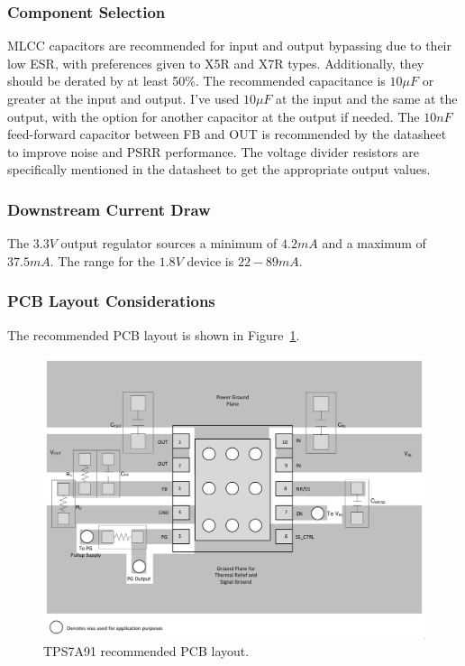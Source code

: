 \subsubsection{Component Selection}
\label{sec:tps7a91-component-selection}

MLCC capacitors are recommended for input and output bypassing due to their low ESR, with
preferences given to X5R and X7R types. Additionally, they should be derated by at least 50\%. The
recommended capacitance is $10 \si{\mu F}$ or greater at the input and output. I've used
$10 \si{\mu F}$ at the input and the same at the output, with the option for another capacitor at
the output if needed. The $10 \si{nF}$ feed-forward capacitor between FB and OUT is recommended by
the datasheet to improve noise and PSRR performance. The voltage divider resistors are specifically
mentioned in the datasheet to get the appropriate output values.

\subsubsection{Downstream Current Draw}
\label{sec:tps7a91-current}

The $3.3 \si{V}$ output regulator sources a minimum of $4.2 \si{mA}$ and a maximum of $37.5
\si{mA}$. The range for the $1.8 \si{V}$ device is $22 - 89 \si{mA}$.

\subsubsection{PCB Layout Considerations}
\label{sec:tps7a91-pcb}

The recommended PCB layout is shown in Figure~\ref{fig:tps7a91-pcb}.

\begin{figure}[h]
        \centering
        \includegraphics[width=\textwidth]{data/tps7a91-pcb}
        \caption{TPS7A91 recommended PCB layout.}
        \label{fig:tps7a91-pcb}
\end{figure}

